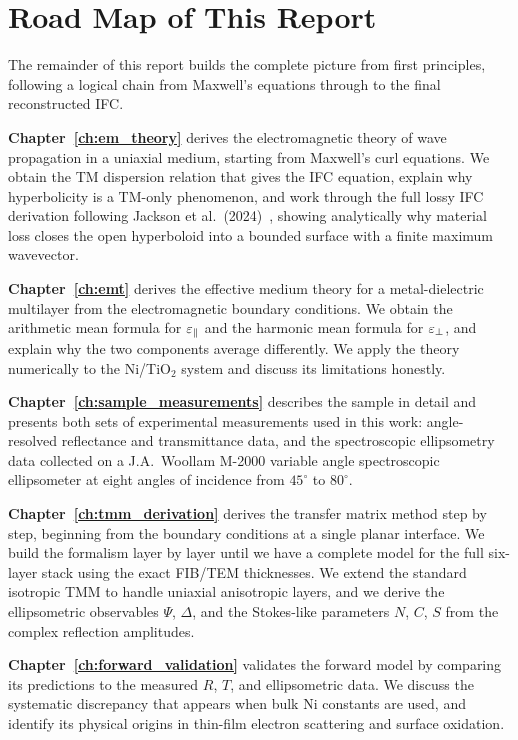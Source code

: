 \section{Road Map of This Report}

The remainder of this report builds the complete picture from first principles,
following a logical chain from Maxwell's equations through to the final
reconstructed IFC.

\textbf{Chapter~\ref{ch:em_theory}} derives the electromagnetic theory of
wave propagation in a uniaxial medium, starting from Maxwell's curl equations.
We obtain the TM dispersion relation that gives the IFC equation, explain why
hyperbolicity is a TM-only phenomenon, and work through the full lossy IFC
derivation following Jackson et al.\ (2024)~\cite{jackson2024}, showing
analytically why material loss closes the open hyperboloid into a bounded
surface with a finite maximum wavevector.

\textbf{Chapter~\ref{ch:emt}} derives the effective medium theory for a
metal-dielectric multilayer from the electromagnetic boundary conditions. We
obtain the arithmetic mean formula for $\varepsilon_{\parallel}$ and the harmonic mean formula
for $\varepsilon_{\perp}$, and explain why the two components average differently. We apply
the theory numerically to the Ni/TiO$_2$ system and discuss its limitations
honestly.

\textbf{Chapter~\ref{ch:sample_measurements}} describes the sample in detail
and presents both sets of experimental measurements used in this work:
angle-resolved reflectance and transmittance data, and the spectroscopic
ellipsometry data collected on a J.A.\ Woollam M-2000 variable angle
spectroscopic ellipsometer at eight angles of incidence from $45^\circ$ to
$80^\circ$.

\textbf{Chapter~\ref{ch:tmm_derivation}} derives the transfer matrix method
step by step, beginning from the boundary conditions at a single planar
interface. We build the formalism layer by layer until we have a complete model
for the full six-layer stack using the exact FIB/TEM thicknesses. We extend
the standard isotropic TMM to handle uniaxial anisotropic layers, and we
derive the ellipsometric observables $\Psi$, $\Delta$, and the Stokes-like
parameters $N$, $C$, $S$ from the complex reflection amplitudes.

\textbf{Chapter~\ref{ch:forward_validation}} validates the forward model by
comparing its predictions to the measured $R$, $T$, and ellipsometric data.
We discuss the systematic discrepancy that appears when bulk Ni constants are
used, and identify its physical origins in thin-film electron scattering and
surface oxidation.

